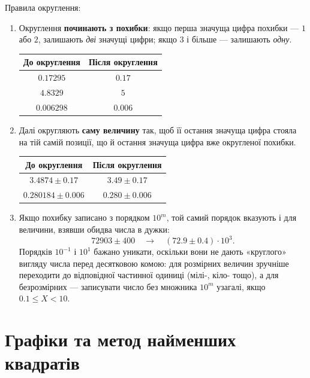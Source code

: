 Правила округлення:
\begin{enumerate}
	\item Округлення \textbf{починають з похибки}: якщо перша значуща
	цифра похибки --- $1$ або $2$, залишають \emph{дві} значущі цифри;
	якщо $3$ і більше --- залишають \emph{одну}.
	\begin{center}
		\begin{tabular}{cc}
			\toprule
			До округлення & Після округлення \\ \midrule
			$0.17295$     & $0.17$           \\
			$4.8329$      & $5$              \\
			$0.006298$    & $0.006$          \\ \bottomrule
		\end{tabular}
	\end{center}
	\item Далі округляють \textbf{саму величину} так, щоб її остання
	значуща цифра стояла на тій самій позиції, що й остання значуща
	цифра вже округленої похибки.
	\begin{center}
		\begin{tabular}{cc}
			\toprule
			До округлення      & Після округлення \\ \midrule
			$3.4874\pm0.17$    & $3.49\pm0.17$    \\
			$0.280184\pm0.006$ & $0.280\pm0.006$  \\ \bottomrule
		\end{tabular}
	\end{center}
	\item Якщо похибку записано з порядком $10^m$, той самий порядок
	вказують і для величини, взявши обидва числа в дужки:
	\begin{equation*}
		72903 \pm 400 \quad \longrightarrow \quad (72.9 \pm 0.4) \cdot 10^3.
	\end{equation*}
	Порядків $10^{-1}$ і $10^{1}$ бажано уникати, оскільки вони не дають
	«круглого» вигляду числа перед десятковою комою: для розмірних
	величин зручніше переходити до відповідної частинної одиниці (мілі-,
	кіло- тощо), а для безрозмірних --- записувати число без множника
	$10^m$ узагалі, якщо $0.1 \le X < 10$.
\end{enumerate}

\section{Графіки та метод найменших квадратів}
\label{sec:lsq}

